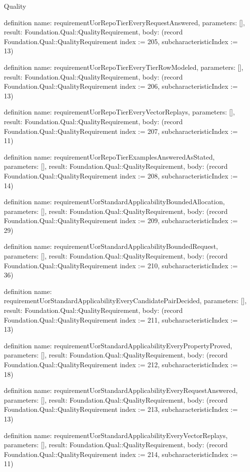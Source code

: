 \begin{lexlean}{Quality}
\begin{semanticmodule}
definition{
  name: requirementUorRepoTierEveryRequestAnswered,
  parameters: [],
  result: Foundation.Qual::QualityRequirement,
  body: (record Foundation.Qual::QualityRequirement {index := 205, subcharacteristicIndex := 13})
}

definition{
  name: requirementUorRepoTierEveryTierRowModeled,
  parameters: [],
  result: Foundation.Qual::QualityRequirement,
  body: (record Foundation.Qual::QualityRequirement {index := 206, subcharacteristicIndex := 13})
}

definition{
  name: requirementUorRepoTierEveryVectorReplays,
  parameters: [],
  result: Foundation.Qual::QualityRequirement,
  body: (record Foundation.Qual::QualityRequirement {index := 207, subcharacteristicIndex := 11})
}

definition{
  name: requirementUorRepoTierExamplesAnsweredAsStated,
  parameters: [],
  result: Foundation.Qual::QualityRequirement,
  body: (record Foundation.Qual::QualityRequirement {index := 208, subcharacteristicIndex := 14})
}

definition{
  name: requirementUorStandardApplicabilityBoundedAllocation,
  parameters: [],
  result: Foundation.Qual::QualityRequirement,
  body: (record Foundation.Qual::QualityRequirement {index := 209, subcharacteristicIndex := 29})
}

definition{
  name: requirementUorStandardApplicabilityBoundedRequest,
  parameters: [],
  result: Foundation.Qual::QualityRequirement,
  body: (record Foundation.Qual::QualityRequirement {index := 210, subcharacteristicIndex := 36})
}

definition{
  name: requirementUorStandardApplicabilityEveryCandidatePairDecided,
  parameters: [],
  result: Foundation.Qual::QualityRequirement,
  body: (record Foundation.Qual::QualityRequirement {index := 211, subcharacteristicIndex := 13})
}

definition{
  name: requirementUorStandardApplicabilityEveryPropertyProved,
  parameters: [],
  result: Foundation.Qual::QualityRequirement,
  body: (record Foundation.Qual::QualityRequirement {index := 212, subcharacteristicIndex := 18})
}

definition{
  name: requirementUorStandardApplicabilityEveryRequestAnswered,
  parameters: [],
  result: Foundation.Qual::QualityRequirement,
  body: (record Foundation.Qual::QualityRequirement {index := 213, subcharacteristicIndex := 13})
}

definition{
  name: requirementUorStandardApplicabilityEveryVectorReplays,
  parameters: [],
  result: Foundation.Qual::QualityRequirement,
  body: (record Foundation.Qual::QualityRequirement {index := 214, subcharacteristicIndex := 11})
}


\end{semanticmodule}
\end{lexlean}
